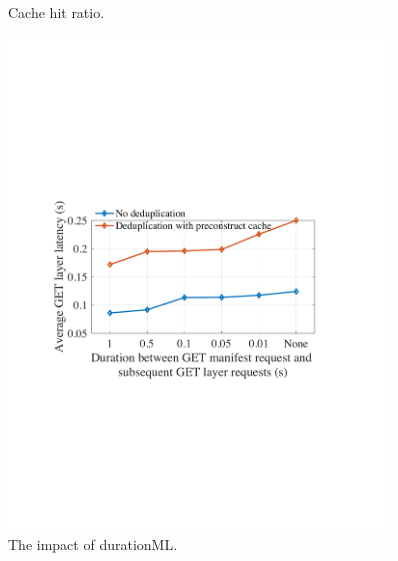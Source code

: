 \begin{figure}[t]
\begin{minipage}{0.3\textwidth}
		\caption{Cache hit ratio.}%
		\label{fig:eval-cachehitratios}
	\end{minipage}%
	\begin{minipage}{0.3\textwidth}
	\centering
	\includegraphics[width=0.9\textwidth]{graphs/durationML.pdf}
	\caption{The impact of durationML.}
	\label{fig:eval-durationML}
   \end{minipage}

\end{figure}


